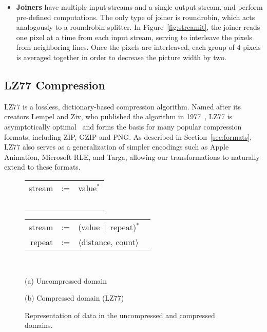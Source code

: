\begin{itemize}
\item {\bf Joiners} have multiple input streams and a single output
  stream, and perform pre-defined computations.  The only type of
  joiner is roundrobin, which acts analogously to a roundrobin
  splitter.  In Figure~\ref{fig:streamit}, the joiner reads one pixel
  at a time from each input stream, serving to interleave the pixels
  from neighboring lines.  Once the pixels are interleaved, each group
  of 4 pixels is averaged together in order to decrease the picture
  width by two.

\end{itemize}

\subsection{LZ77 Compression}

LZ77 is a lossless, dictionary-based compression algorithm.  Named
after its creators Lempel and Ziv, who published the algorithm in
1977~\cite{lz77}, LZ77 is asymptotically optimal~\cite{wyner94optimal}
and forms the basis for many popular compression formats, including
ZIP, GZIP and PNG.  As described in Section~\ref{sec:formats}, LZ77
also serves as a generalization of simpler encodings such as Apple
Animation, Microsoft RLE, and Targa, allowing our transformations to
naturally extend to these formats.

\begin{figure}[t]
\begin{minipage}{1.6in}
\hspace{-5pt}\begin{tabular}{rcl}
stream&\hspace{-9pt}:=&\hspace{-9pt}value$^*$\\ ~ & ~
\end{tabular}
\end{minipage}
\begin{minipage}{1.8in}
\hspace{-5pt}\begin{tabular}{rcl}
stream&\hspace{-9pt}:=&\hspace{-9pt}(value~$|$~repeat)$^*$ ~ \\
repeat&\hspace{-9pt}:=&\hspace{-9pt}$\langle$distance, count$\rangle$
\end{tabular}
\end{minipage} 
~ \\
\begin{minipage}{1.6in}
(a) Uncompressed domain
\end{minipage}
(b) Compressed domain (LZ77)
\caption{Representation of data in the uncompressed and compressed
domains.  \protect\label{fig:domains}}
\end{figure}

